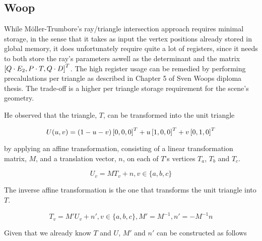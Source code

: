 \subsection{Woop}


While Möller-Trumbore's ray/triangle intersection approach requires minimal
storage, in the sense that it takes as input the vertex positions already stored
in global memory, it does unfortunately require quite a lot of registers, since
it needs to both store the ray's parameters aswell as the determinant and the
matrix $\left[Q \cdot E_2, P \cdot T, Q \cdot D \right]^T$. The high register usage
can be remedied by performing precalulations per triangle as described in
Chapter 5 of Sven Woops diploma thesis. The trade-off
is a higher per triangle storage requirement for the scene's geometry.




He observed that the triangle, $T$, can be transformed into the unit triangle

\begin{displaymath}
  U(u, v) = (1-u-v)\left[0, 0, 0 \right]^T + u\left[1, 0, 0 \right]^T + v\left[0, 1, 0 \right]^T
\end{displaymath}

by applying an affine transformation, consisting of a linear transformation
matrix, $M$, and a translation vector, $n$, on each of $T$'s vertices $T_a$,
$T_b$ and $T_c$.

\begin{displaymath}
  U_v = M T_v + n, v \in \{a, b, c\}
\end{displaymath}

The inverse affine transformation is the one that transforms the unit
triangle into $T$.

\begin{displaymath}
  T_v = M' U_v + n', v \in \{a, b, c\}, M' = M^{-1}, n' = -M^{-1}n
\end{displaymath}

Given that we already know $T$ and $U$, $M'$ and $n'$ can be
constructed as follows

